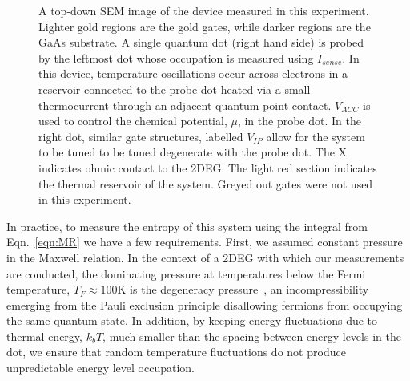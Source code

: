 \begin{figure}[h]
\centering
{}
\caption{ A top-down SEM image of the device measured in this experiment. Lighter gold regions are the gold gates, while darker regions are the GaAs substrate. A single quantum dot (right hand side) is probed by the leftmost dot whose occupation is measured using $I_{sense}$. In this device, temperature oscillations occur across electrons in a reservoir connected to the probe dot heated via a small thermocurrent through an adjacent quantum point contact. $V_{ACC}$ is used to control the chemical potential, $\mu$, in the probe dot. In the right dot, similar gate structures, labelled $V_{IP}$ allow for the system to be tuned to be tuned degenerate with the probe dot. The X indicates ohmic contact to the 2DEG. The light red section indicates the thermal reservoir of the system. Greyed out gates were not used in this experiment.}
\label{fig:device}       %
\end{figure}


In practice, to measure the entropy of this system using the integral from Eqn.~\ref{eqn:MR} we have a few requirements. First, we assumed constant pressure in the Maxwell relation. In the context of a \ac{2DEG} with which our measurements are conducted, the dominating pressure at temperatures below the Fermi temperature, $T_F \approx 100$K is the degeneracy pressure~\cite{ashcroftmermin}, an incompressibility emerging from the Pauli exclusion principle disallowing fermions from occupying the same quantum state. In addition, by keeping energy fluctuations due to thermal energy, $k_bT$, much smaller than the spacing between energy levels in the dot, we ensure that random temperature fluctuations do not produce unpredictable energy level occupation.

